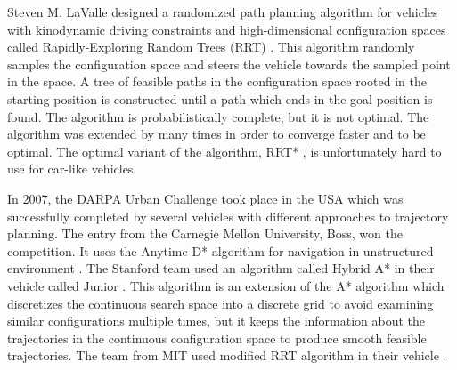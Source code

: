Steven M. LaValle designed a randomized path planning algorithm for vehicles with kinodynamic driving constraints and high-dimensional configuration spaces called Rapidly-Exploring Random Trees (RRT) \cite{RRT}. This algorithm randomly samples the configuration space and steers the vehicle towards the sampled point in the space. A tree of feasible paths in the configuration space rooted in the starting position is constructed until a path which ends in the goal position is found. The algorithm is probabilistically complete, but it is not optimal. The algorithm was extended by many times in order to converge faster and to be optimal. The optimal variant of the algorithm, RRT* \cite{RRT_star}, is unfortunately hard to use for car-like vehicles.

In 2007, the DARPA Urban Challenge took place in the USA which was successfully completed by several vehicles with different approaches to trajectory planning. The entry from the Carnegie Mellon University, Boss, won the competition. It uses the Anytime D* algorithm for navigation in unstructured environment \cite{Boss}. The Stanford team used an algorithm called Hybrid A* in their vehicle called Junior \cite{Junior}. This algorithm is an extension of the A* algorithm which discretizes the continuous search space into a discrete grid to avoid examining similar configurations multiple times, but it keeps the information about the trajectories in the continuous configuration space to produce smooth feasible trajectories. The team from MIT used modified RRT algorithm in their vehicle \cite{RRT_urban_driving}.
